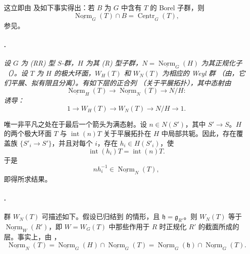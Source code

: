 这立即由  及如下事实得出：若 \(B\) 为 \(G\) 中含有 \(T\) 的 Borel 子群，则
\[
  \underline{\operatorname{Norm}}_G(T)\cap B
  =
  \underline{\operatorname{Centr}}_G(T),
\]
参见。

\paragraph{.}
\textit{设 \(G\) 为 \textup{(RR)} 型 \(S\)-群，\(H\) 为其 \textup{(R)} 型子群，\(N=\underline{\operatorname{Norm}}_G(H)\) 为其正规化子 \textup{（）}。设 \(T\) 为 \(H\) 的极大环面，\(W_H(T)\) 和 \(W_N(T)\) 为相应的 Weyl 群 \textup{（由，它们平展、拟有限且分离）}。有如下层的正合列 \textup{（关于平展拓扑）}，其中态射由}
\[
  \underline{\operatorname{Norm}}_H(T)
  \longrightarrow
  \underline{\operatorname{Norm}}_N(T)
  \longrightarrow
  N/H:
\]
\textit{诱导：}
\[
  1
  \longrightarrow W_H(T)
  \longrightarrow W_N(T)
  \longrightarrow N/H
  \longrightarrow 1.
\]

唯一非平凡之处在于最后一个箭头为满态射。设 \(n\in N(S')\)，其中 \(S'\to S\)。\(H\) 的两个极大环面 \(T\) 与 \(\operatorname{int}(n)T\) 关于平展拓扑在 \(H\) 中局部共轭。因此，存在覆盖族 \(\{S'_i\to S'\}\)，并且对每个 \(i\)，存在 \(h_i\in H(S'_i)\)，使
\[
  \operatorname{int}(h_i)T=\operatorname{int}(n)T.
\]
于是
\[
  nh_i^{-1}\in \underline{\operatorname{Norm}}_N(T),
\]
即得所求结果。

\paragraph{.}
群 \(W_N(T)\) 可描述如下。假设已归结到  的情形，且 \(\mathfrak h=\mathfrak g_{R'}\)。则 \(W_N(T)\) 等于 \(\underline{\operatorname{Norm}}_W(R')\)，即 \(W=W_G(T)\) 中那些作用于 \(R\) 时正规化 \(R'\) 的截面所成的层。事实上，由 ，
\[
  \underline{\operatorname{Norm}}_N(T)
  =
  \underline{\operatorname{Norm}}_G(H)
    \cap \underline{\operatorname{Norm}}_G(T)
  =
  \underline{\operatorname{Norm}}_G(\mathfrak h)
    \cap \underline{\operatorname{Norm}}_G(T).
\]

